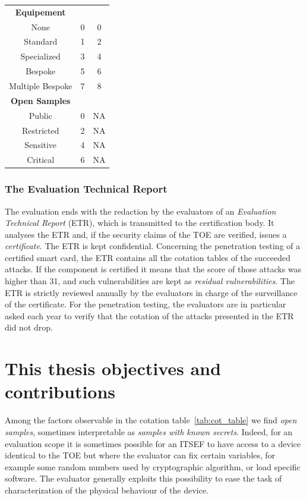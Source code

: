 \begin{table}[]
\begin{tabular}{ccc}
\midrule
\textbf{Equipement}           &                &              \\
None                          & 0              & 0            \\
Standard                      & 1              & 2            \\
Specialized                   & 3              & 4            \\
Bespoke                       & 5              & 6            \\
Multiple Bespoke              & 7              & 8            \\
\midrule
\textbf{Open Samples}         &                &              \\
Public                        & 0              & NA           \\
Restricted                    & 2              & NA           \\
Sensitive                     & 4              & NA           \\
Critical                      & 6              & NA    \\	
\bottomrule      
\end{tabular}
\end{table}


\subsubsection{The Evaluation Technical Report}
The evaluation ends with the redaction by the evaluators of an \emph{Evaluation Technical Report} (ETR), which is transmitted to the certification body. It analyses the ETR and, if the security claims of the TOE are verified, issues a \emph{certificate}. The ETR is kept confidential. Concerning the penetration testing of a certified smart card, the ETR contains all the cotation tables of the succeeded attacks. If the component is certified it means that the score of those attacks was higher than 31, and such vulnerabilities are kept as \emph{residual vulnerabilities}. The ETR is strictly reviewed annually by the evaluators in charge of the surveillance of the certificate. For the penetration testing, the evaluators are in particular asked each year to verify that the cotation of the attacks presented in the ETR did not drop.

\section{This thesis objectives and contributions}\label{sec:this_thesis_objectives}
Among the factors observable in the cotation table~\ref{tab:cot_table} we find \emph{open samples}, sometimes interpretable as \emph{samples with known secrets}. Indeed, for an evaluation scope it is sometimes possible for an ITSEF to have access to a device identical to the TOE but where the evaluator can fix certain variables, for example some random numbers used by cryptographic algorithm, or load specific software. The evaluator generally exploits this possibility to ease the task of characterization of the physical behaviour of the device.\\

